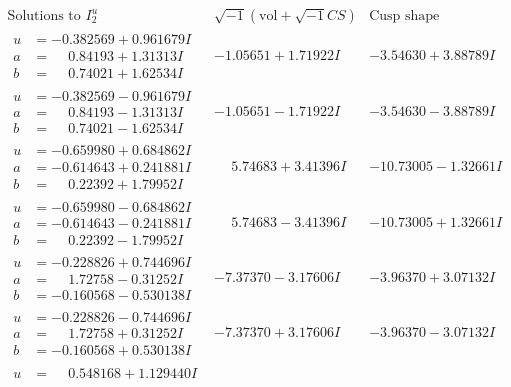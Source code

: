 \documentclass[1p]{elsarticle_modified}
\theoremstyle{definition}
\newcommand{\I}{\sqrt{-1}}
\begin{document}
$$\begin{array}{c|c|c}  
\text{Solutions to }I^u_{2}& \I (\text{vol} + \sqrt{-1}CS) & \text{Cusp shape}\\
 \hline 
\begin{aligned}
u &= -0.382569 + 0.961679 I \\
a &= \phantom{-}0.84193 + 1.31313 I \\
b &= \phantom{-}0.74021 + 1.62534 I\end{aligned}
 & -1.05651 + 1.71922 I & -3.54630 + 3.88789 I \\ \hline\begin{aligned}
u &= -0.382569 - 0.961679 I \\
a &= \phantom{-}0.84193 - 1.31313 I \\
b &= \phantom{-}0.74021 - 1.62534 I\end{aligned}
 & -1.05651 - 1.71922 I & -3.54630 - 3.88789 I \\ \hline\begin{aligned}
u &= -0.659980 + 0.684862 I \\
a &= -0.614643 + 0.241881 I \\
b &= \phantom{-}0.22392 + 1.79952 I\end{aligned}
 & \phantom{-}5.74683 + 3.41396 I & -10.73005 - 1.32661 I \\ \hline\begin{aligned}
u &= -0.659980 - 0.684862 I \\
a &= -0.614643 - 0.241881 I \\
b &= \phantom{-}0.22392 - 1.79952 I\end{aligned}
 & \phantom{-}5.74683 - 3.41396 I & -10.73005 + 1.32661 I \\ \hline\begin{aligned}
u &= -0.228826 + 0.744696 I \\
a &= \phantom{-}1.72758 - 0.31252 I \\
b &= -0.160568 - 0.530138 I\end{aligned}
 & -7.37370 - 3.17606 I & -3.96370 + 3.07132 I \\ \hline\begin{aligned}
u &= -0.228826 - 0.744696 I \\
a &= \phantom{-}1.72758 + 0.31252 I \\
b &= -0.160568 + 0.530138 I\end{aligned}
 & -7.37370 + 3.17606 I & -3.96370 - 3.07132 I \\ \hline\begin{aligned}
u &= \phantom{-}0.548168 + 1.129440 I \\

\end{aligned}
\end{array}$$
\end{document}
